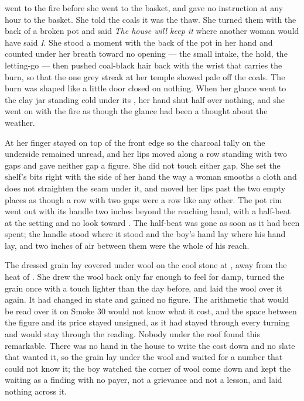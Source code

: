  went to the fire before she went to the basket, and gave no instruction at any hour to the basket. She told the coals it was the thaw. She turned them with the back of a broken pot and said \emph{The house will keep it} where another woman would have said \emph{I}. She stood a moment with the back of the pot in her hand and counted under her breath toward no opening --- the small intake, the hold, the letting-go --- then pushed coal-black hair back with the wrist that carries the burn, so that the one grey streak at her temple showed pale off the coals. The burn was shaped like a little door closed on nothing. When her glance went to the clay jar standing cold under its , her hand shut half over nothing, and she went on with the fire as though the glance had been a thought about the weather.

At  her finger stayed on top of the front edge so the charcoal tally on the underside remained unread, and her lips moved along a row standing with two gaps and gave neither gap a figure. She did not touch either gap. She set the shelf's bits right with the side of her hand the way a woman smooths a cloth and does not straighten the seam under it, and moved her lips past the two empty places as though a row with two gaps were a row like any other. The pot rim went out with its handle two inches beyond the reaching hand, with a half-beat at the setting and no look toward . The half-beat was gone as soon as it had been spent; the handle stood where it stood and the boy's hand lay where his hand lay, and two inches of air between them were the whole of his reach.

The dressed grain lay covered under wool on the cool stone at , away from the heat of . She drew the wool back only far enough to feel for damp, turned the grain once with a touch lighter than the day before, and laid the wool over it again. It had changed in state and gained no figure. The arithmetic that would be read over it on Smoke 30 would not know what it cost, and the space between the figure and its price stayed unsigned, as it had stayed through every turning and would stay through the reading. Nobody under the roof found this remarkable. There was no hand in the house to write the cost down and no slate that wanted it, so the grain lay under the wool and waited for a number that could not know it; the boy watched the corner of wool come down and kept the waiting as a finding with no payer, not a grievance and not a lesson, and laid nothing across it.

